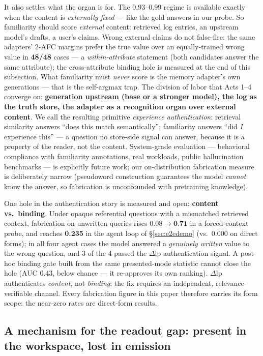 \documentclass[11pt]{article}
\newcommand{\dlp}{\Delta\mathrm{lp}}
\begin{document}
It also settles what the organ is for. The 0.93--0.99 regime is available exactly when the
content is \emph{externally fixed} --- like the gold answers in our probe. So familiarity should
score \emph{external} content: retrieved log entries, an upstream model's drafts, a user's
claims. Wrong external claims do not false-fire: the same adapters' 2-AFC margins prefer the
true value over an equally-trained wrong value in \textbf{48/48} cases --- a
\emph{within-attribute} statement (both candidates answer the same attribute); the
cross-attribute binding hole is measured at the end of this subsection. What familiarity must
\emph{never} score is the memory adapter's own generations --- that is the self-argmax trap. The
division of labor that Acts 1--4 converge on: \textbf{generation upstream (base or a
stronger model), the log as the truth store, the adapter as a recognition organ over external
content}. We call the resulting primitive \emph{experience authentication}: retrieval similarity
answers ``does this match semantically''; familiarity answers ``did \emph{I} experience this''
--- a question no store-side signal can answer, because it is a property of the reader, not the
content. System-grade evaluation --- behavioral compliance with familiarity annotations, real
workloads, public hallucination benchmarks --- is explicitly future work; our on-distribution
fabrication measure is deliberately narrow (pseudoword construction guarantees the model
\emph{cannot} know the answer, so fabrication is unconfounded with pretraining knowledge).

One hole in the authentication story is measured and open: \textbf{content vs.\ binding}. Under
opaque referential questions with a mismatched retrieved context, fabrication on unwritten
queries rises $0.08\to\textbf{0.71}$ in a forced-context probe, and reaches \textbf{0.235} in
the agent loop of \S\ref{sec:e2edemo} (vs.\ 0.000 on direct forms); in all four agent cases the
model answered a \emph{genuinely written} value to the wrong question, and 3 of the 4 passed
the $\dlp$ authentication signal. A post-hoc binding gate built from the same presented-mode statistic
cannot close the hole (AUC 0.43, below chance --- it re-approves its own ranking). $\dlp$
authenticates \emph{content}, not \emph{binding}; the fix requires an independent,
relevance-verifiable channel. Every fabrication figure in this paper therefore carries its form
scope: the near-zero rates are direct-form results.

\subsection{A mechanism for the readout gap: present in the workspace, lost in emission}\label{sec:jspace}
\end{document}
